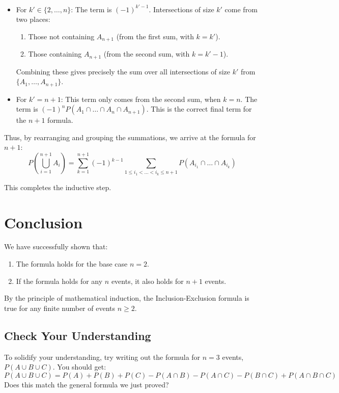 \documentclass[11pt,a4paper]{article}
\begin{document}
\begin{enumerate}
\begin{itemize}
        \item For $k' \in \{2, \dots, n\}$: The term is $(-1)^{k'-1}$. Intersections of size $k'$ come from two places:
        \begin{enumerate}
            \item Those not containing $A_{n+1}$ (from the first sum, with $k=k'$).
            \item Those containing $A_{n+1}$ (from the second sum, with $k=k'-1$).
        \end{enumerate}
        Combining these gives precisely the sum over all intersections of size $k'$ from $\{A_1, \dots, A_{n+1}\}$.
        \item For $k'=n+1$: This term only comes from the second sum, when $k=n$. The term is $(-1)^n P(A_1 \cap \dots \cap A_n \cap A_{n+1})$. This is the correct final term for the $n+1$ formula.
    \end{itemize}
    Thus, by rearranging and grouping the summations, we arrive at the formula for $n+1$:
    $$ P\left(\bigcup_{i=1}^{n+1} A_i\right) = \sum_{k=1}^{n+1} (-1)^{k-1} \sum_{1 \le i_1 < \dots < i_k \le n+1} P(A_{i_1} \cap \dots \cap A_{i_k}) $$
\end{enumerate}
This completes the inductive step.

\section{Conclusion}

We have successfully shown that:
\begin{enumerate}
    \item The formula holds for the base case $n=2$.
    \item If the formula holds for any $n$ events, it also holds for $n+1$ events.
\end{enumerate}
By the principle of mathematical induction, the Inclusion-Exclusion formula is true for any finite number of events $n \ge 2$.

\subsection*{Check Your Understanding}
To solidify your understanding, try writing out the formula for $n=3$ events, $P(A \cup B \cup C)$. You should get:
$$ P(A \cup B \cup C) = P(A) + P(B) + P(C) - P(A \cap B) - P(A \cap C) - P(B \cap C) + P(A \cap B \cap C) $$
Does this match the general formula we just proved?

\newpage
\end{document}
